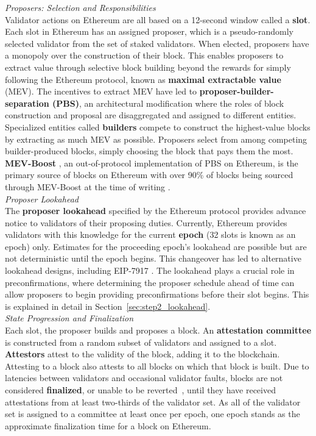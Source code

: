\documentclass[a4paper]{article}
\theoremstyle{boldstyle}
\begin{document}
    \textit{Proposers: Selection and Responsibilities} \\
        Validator actions on Ethereum are all based on a 12-second window called a \textbf{slot}. Each slot in Ethereum has an assigned proposer, which is a pseudo-randomly selected validator from the set of staked validators. When elected, proposers have a monopoly over the construction of their block. This enables proposers to extract value through selective block building beyond the rewards for simply following the Ethereum protocol, known as \textbf{maximal extractable value} (MEV).
        The incentives to extract MEV have led to \textbf{proposer-builder-separation (PBS)}, an architectural modification where the roles of block construction and proposal are disaggregated and assigned to different entities. Specialized entities called \textbf{builders} compete to construct the highest-value blocks by extracting as much MEV as possible. 
        Proposers select from among competing builder-produced blocks, simply choosing the block that pays them the most. \textbf{MEV-Boost} \cite{MEV-Boost}, an out-of-protocol implementation of PBS on Ethereum, is the primary source of blocks on Ethereum with over 90\% of blocks being sourced through MEV-Boost at the time of writing \cite{MEV.pics}. \\

    \textit{Proposer Lookahead} \\
        The \textbf{proposer lookahead} specified by the Ethereum protocol provides advance notice to validators of their proposing duties. Currently, Ethereum provides validators with this knowledge for the current \textbf{epoch} (32 slots is known as an epoch) only. Estimates for the proceeding epoch's lookahead are possible but are not deterministic until the epoch begins. This changeover has led to alternative lookahead designs, including EIP-7917 \cite{EIP7917}. The lookahead plays a crucial role in preconfirmations, where determining the proposer schedule ahead of time can allow proposers to begin providing preconfirmations before their slot begins. This is explained in detail in Section~\ref{sec:step2_lookahead}. \\
    
    \textit{State Progression and Finalization}  \\
        Each slot, the proposer builds and proposes a block. An \textbf{attestation committee} is constructed from a random subset of validators and assigned to a slot. \textbf{Attestors} attest to the validity of the block, adding it to the blockchain. Attesting to a block also attests to all blocks on which that block is built. Due to latencies between validators and occasional validator faults, blocks are not considered \textbf{finalized}, or unable to be reverted~\cite{ETH2_book}, until they have received attestations from at least two-thirds of the validator set. As all of the validator set is assigned to a committee at least once per epoch, one epoch stands as the approximate finalization time for a block on Ethereum. 
\end{document}

